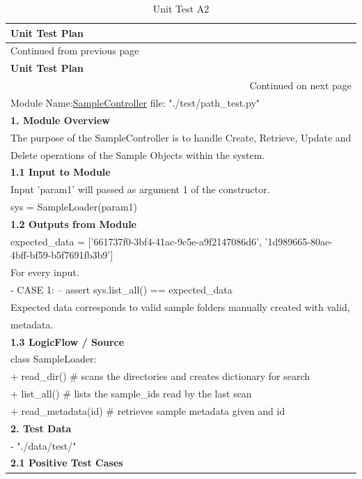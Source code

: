 \documentclass[12pt,a4paper,man]{report}
\begin{document}
\begin{longtable}{|p{7in}|}
\caption{\label{table:utest_a2}
Unit Test A2}
\\
\hline
\textbf{Unit Test Plan} \cellcolor{blue!25}\\
\hline
\endfirsthead
\multicolumn{1}{l}{Continued from previous page} \\
\hline

\textbf{Unit Test Plan} \cellcolor{blue!25} \\

\hline
\endhead
\hline\multicolumn{1}{r}{Continued on next page} \\
\endfoot
\endlastfoot
\hline
\hline
Module Name:\underline{SampleController} \hspace{2in}  file:  "./test/path\_test.py"\\
\hline
\textbf{1. Module Overview}\\
\hline
The purpose of the SampleController is to  handle Create, Retrieve, Update and\\
Delete operations of the Sample Objects within the system.\\
\hline
\textbf{1.1 Input to Module}\\
\hline
Input 'param1' will passed as argument 1 of the constructor.\\
sys = SampleLoader(param1)\\
\hline
\textbf{1.2 Outputs from Module}\\
\hline
expected\_data =  ['661737f0-3bf4-41ac-9c5e-a9f2147086d6', '1d989665-80ae-4bff-bf59-b5f7691fb3b9']\\
For every input.\\
- CASE 1:  -- assert sys.list\_all() == expected\_data\\
Expected data corresponds to valid sample folders manually created with valid,\\
metadata.\\
\hline
\textbf{1.3 LogicFlow / Source}\\
\hline
class SampleLoader:\\
+ read\_dir() \# scans the directories and creates dictionary for search\\
+ list\_all() \# lists the sample\_ids read by the last scan\\
+ read\_metadata(id) \#  retrieves sample metadata given and id\\
\hline
\textbf{2. Test Data}\\
\hline
- "./data/test/"\\
\hline
\textbf{2.1 Positive Test Cases}\\

\end{longtable}
\end{document}
